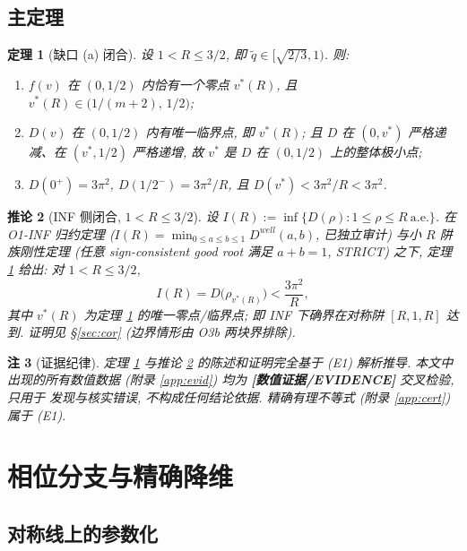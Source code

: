 \documentclass[UTF8]{ctexart}
\newtheorem{theorem}{定理}[section]
\newtheorem{corollary}[theorem]{推论}
\newtheorem{remark}[theorem]{注}
\newcommand{\EVID}{\textbf{[数值证据/EVIDENCE]}}
\begin{document}
\subsection{主定理}

\begin{theorem}[缺口 (a) 闭合]\label{thm:main}
设 $1<R\le3/2$, 即 $\tilde q\in[\sqrt{2/3},1)$. 则:
\begin{enumerate}
	\item[(i)] $f(v)$ 在 $(0,1/2)$ 内恰有一个零点 $v^*(R)$, 且
		$v^*(R)\in\bigl(1/(m+2),\,1/2\bigr)$;
	\item[(ii)] $D(v)$ 在 $(0,1/2)$ 内有唯一临界点, 即 $v^*(R)$; 且 $D$ 在
		$(0,v^*)$ 严格递减、在 $(v^*,1/2)$ 严格递增, 故 $v^*$ 是 $D$ 在
		$(0,1/2)$ 上的整体极小点;
	\item[(iii)] $D(0^+)=3\pi^2$, $D(1/2^-)=3\pi^2/R$, 且
		$D(v^*)<3\pi^2/R<3\pi^2$.
\end{enumerate}
\end{theorem}

\begin{corollary}[INF 侧闭合, $1<R\le3/2$]\label{cor:inf}
设 $I(R):=\inf\{D(\rho):1\le\rho\le R\ \text{a.e.}\}$. 在 O1-INF 归约定理
($I(R)=\min_{0\le a\le b\le1}D^{well}(a,b)$, 已独立审计) 与小 $R$ 阱族刚性定理
(任意 sign-consistent good root 满足 $a+b=1$, STRICT) 之下, 定理 \ref{thm:main}
给出: 对 $1<R\le3/2$,
\begin{equation}
	I(R)=D\bigl(\rho_{v^*(R)}\bigr)<\frac{3\pi^2}{R},
\end{equation}
其中 $v^*(R)$ 为定理 \ref{thm:main} 的唯一零点/临界点; 即 INF 下确界在对称阱
$[R,1,R]$ 达到. 证明见 \S\ref{sec:cor} (边界情形由 O3b 两块界排除).
\end{corollary}

\begin{remark}[证据纪律]\label{rem:disc}
定理 \ref{thm:main} 与推论 \ref{cor:inf} 的陈述和证明完全基于 (E1) 解析推导.
本文中出现的所有数值数据 (附录 \ref{app:evid}) 均为 \EVID{} 交叉检验, 只用于
发现与核实错误, 不构成任何结论依据. 精确有理不等式 (附录 \ref{app:cert}) 属于
(E1).
\end{remark}

\section{相位分支与精确降维}\label{sec:phases}

\subsection{对称线上的参数化}
\end{document}
